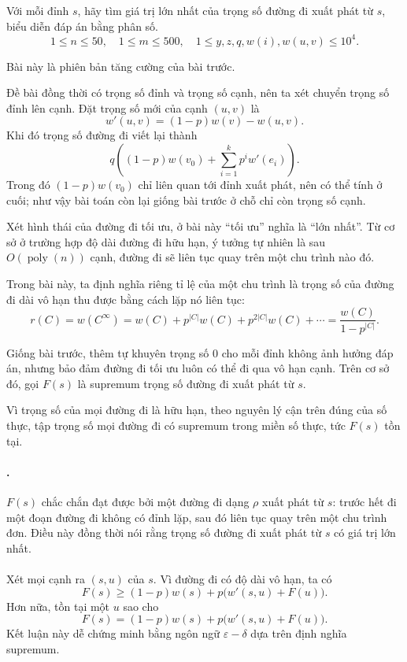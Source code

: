 \documentclass[11pt]{article}
\begin{document}
Với mỗi đỉnh \(s\), hãy tìm giá trị lớn nhất của trọng số đường đi xuất phát
từ \(s\), biểu diễn đáp án bằng phân số.
\[
  1\le n\le50,\quad
  1\le m\le500,\quad
  1\le y,z,q,w(i),w(u,v)\le10^4.
\]

Bài này là phiên bản tăng cường của bài trước.

Đề bài đồng thời có trọng số đỉnh và trọng số cạnh, nên ta xét chuyển trọng số
đỉnh lên cạnh. Đặt trọng số mới của cạnh \((u,v)\) là
\[
  w'(u,v)=(1-p)w(v)-w(u,v).
\]
Khi đó trọng số đường đi viết lại thành
\[
  q\left((1-p)w(v_0)+\sum_{i=1}^{k}p^i w'(e_i)\right).
\]
Trong đó \((1-p)w(v_0)\) chỉ liên quan tới đỉnh xuất phát, nên có thể tính ở
cuối; như vậy bài toán còn lại giống bài trước ở chỗ chỉ còn trọng số cạnh.

Xét hình thái của đường đi tối ưu, ở bài này ``tối ưu'' nghĩa là ``lớn nhất''.
Từ cơ sở ở trường hợp độ dài đường đi hữu hạn, ý tưởng tự nhiên là sau
\(O(\operatorname{poly}(n))\) cạnh, đường đi sẽ liên tục quay trên một chu
trình nào đó.

Trong bài này, ta định nghĩa riêng tỉ lệ của một chu trình là trọng số của
đường đi dài vô hạn thu được bằng cách lặp nó liên tục:
\[
  r(C)=w(C^\infty)
  =
  w(C)+p^{|C|}w(C)+p^{2|C|}w(C)+\cdots
  =
  \frac{w(C)}{1-p^{|C|}}.
\]

Giống bài trước, thêm tự khuyên trọng số \(0\) cho mỗi đỉnh không ảnh hưởng
đáp án, nhưng bảo đảm đường đi tối ưu luôn có thể đi qua vô hạn cạnh. Trên cơ
sở đó, gọi \(F(s)\) là supremum trọng số đường đi xuất phát từ \(s\).

Vì trọng số của mọi đường đi là hữu hạn, theo nguyên lý cận trên đúng của số
thực, tập trọng số mọi đường đi có supremum trong miền số thực, tức \(F(s)\)
tồn tại.

\paragraph{.}
\(F(s)\) chắc chắn đạt được bởi một đường đi dạng \(\rho\) xuất phát từ \(s\):
trước hết đi một đoạn đường đi không có đỉnh lặp, sau đó liên tục quay trên một
chu trình đơn. Điều này đồng thời nói rằng trọng số đường đi xuất phát từ \(s\)
có giá trị lớn nhất.

\paragraph{}
Xét mọi cạnh ra \((s,u)\) của \(s\). Vì đường đi có độ dài vô hạn, ta có
\[
  F(s)\ge (1-p)w(s)+p\bigl(w'(s,u)+F(u)\bigr).
\]
Hơn nữa, tồn tại một \(u\) sao cho
\[
  F(s)= (1-p)w(s)+p\bigl(w'(s,u)+F(u)\bigr).
\]
Kết luận này dễ chứng minh bằng ngôn ngữ \(\varepsilon-\delta\) dựa trên định
nghĩa supremum.
\end{document}
